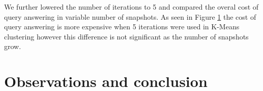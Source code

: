 We further lowered the number of iterations to 5 and compared the overal cost of query answering in variable number of snapshots. As seen in Figure \ref{} the cost of query answering is more expensive when 5 iterations were used in K-Means clustering however this difference is not significant as the number of snapshots grow.



\section{Observations and conclusion}